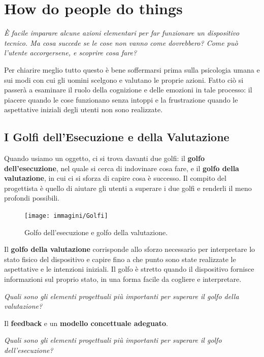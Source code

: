 \chapter{How do people do things}
\textit{È facile imparare alcune azioni elementari per far funzionare un dispositivo tecnico. Ma cosa succede se le cose non vanno come dovrebbero?
Come può l'utente accorgersene, e scoprire cosa fare? }
\vspace{\baselineskip}

Per chiarire meglio tutto questo è bene soffermarsi prima sulla psicologia umana e sui modi con cui gli uomini scelgono e valutano
le proprie azioni. Fatto ciò si passerà a esaminare il ruolo della cognizione e delle emozioni in tale processo: il piacere quando
le cose funzionano senza intoppi e la frustrazione quando le aspettative iniziali degli utenti non sono realizzate.

\section{I Golfi dell'Esecuzione e della Valutazione}
Quando usiamo un oggetto, ci si trova davanti due golfi: il \textbf{golfo dell'esecuzione}, nel quale si cerca di indovinare cosa fare,
e il \textbf{golfo della valutazione}, in cui ci si sforza di capire cosa è successo. Il compito del progettista è quello di aiutare
gli utenti a superare i due golfi e renderli il meno profondi possibili.

\begin{figure}[!h]
	\centering
	\texttt{[image: immagini/Golfi]}
	\caption{Golfo dell'esecuzione e golfo della valutazione.}
\end{figure}

Il \textbf{golfo della valutazione} corrisponde allo sforzo necessario per interpretare lo stato fisico del dispositivo e capire fino a
che punto sono state realizzate le aspettative e le intenzioni iniziali. Il golfo è stretto quando il dispositivo fornisce informazioni
sul proprio stato, in una forma facile da cogliere e interpretare.

\pagebreak

\textit{Quali sono gli elementi progettuali più importanti per superare il golfo della valutazione?}
\vspace{\baselineskip}

Il \textbf{feedback} e un \textbf{modello concettuale adeguato}.

\vspace{\baselineskip}
\textit{Quali sono gli elementi progettuali più importanti per superare il golfo dell'esecuzione?}
\vspace{\baselineskip}

